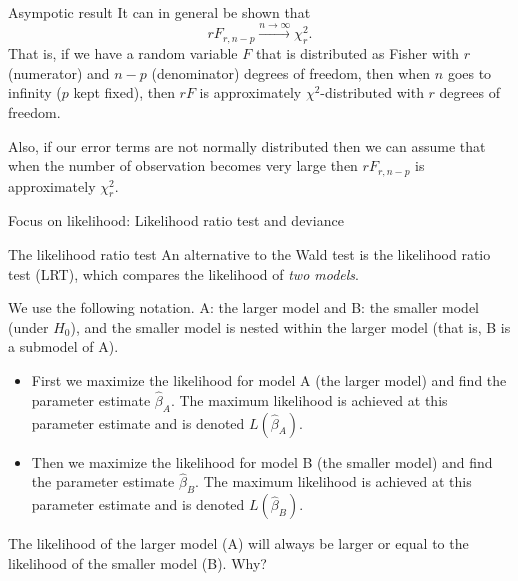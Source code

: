\documentclass[
  ignorenonframetext,
]{beamer}
\providecommand{\tightlist}{%
  \setlength{\itemsep}{0pt}\setlength{\parskip}{0pt}}
\begin{document}
\begin{frame}
\begin{block}{Asympotic result}
\label{asympotic-result}
It can in general be shown that
\[r F_{r,n-p}\stackrel{n\rightarrow \infty}{\longrightarrow} \chi^2_r.\]
That is, if we have a random variable \(F\) that is distributed as
Fisher with \(r\) (numerator) and \(n-p\) (denominator) degrees of
freedom, then when \(n\) goes to infinity (\(p\) kept fixed), then
\(rF\) is approximately \(\chi^2\)-distributed with \(r\) degrees of
freedom.

Also, if our error terms are not normally distributed then we can assume
that when the number of observation becomes very large then
\(rF_{r,n-p}\) is approximately \(\chi^2_r\).
\end{block}
\end{frame}

\begin{frame}{Focus on likelihood: Likelihood ratio test and deviance}
\label{focus-on-likelihood-likelihood-ratio-test-and-deviance}
\begin{block}{The likelihood ratio test}
\label{the-likelihood-ratio-test}
An alternative to the Wald test is the likelihood ratio test (LRT),
which compares the likelihood of \emph{two models}.

We use the following notation. A: the larger model and B: the smaller
model (under \(H_0\)), and the smaller model is nested within the larger
model (that is, B is a submodel of A).
\end{block}
\end{frame}

\begin{frame}
\begin{itemize}
\tightlist
\item
  First we maximize the likelihood for model A (the larger model) and
  find the parameter estimate \(\hat{\beta}_A\). The maximum likelihood
  is achieved at this parameter estimate and is denoted
  \(L(\hat{\beta}_A)\).
\item
  Then we maximize the likelihood for model B (the smaller model) and
  find the parameter estimate \(\hat{\beta}_B\). The maximum likelihood
  is achieved at this parameter estimate and is denoted
  \(L(\hat{\beta}_B)\).
\end{itemize}

The likelihood of the larger model (A) will always be larger or equal to
the likelihood of the smaller model (B). Why?
\end{frame}
\end{document}
